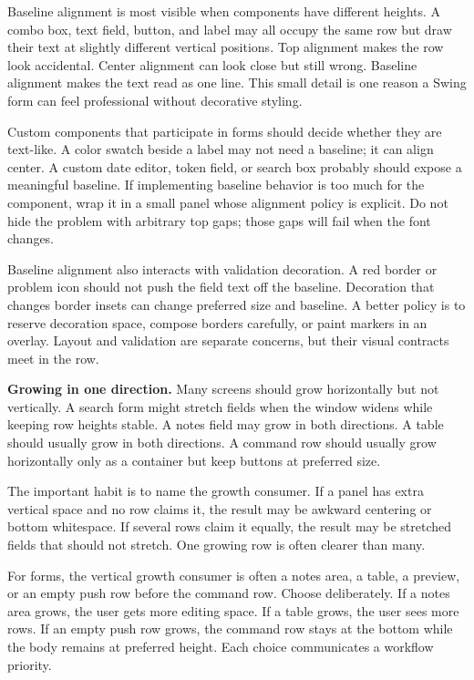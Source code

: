 Baseline alignment is most visible when components have different heights. A
combo box, text field, button, and label may all occupy the same row but draw
their text at slightly different vertical positions. Top alignment makes the row
look accidental. Center alignment can look close but still wrong. Baseline
alignment makes the text read as one line. This small detail is one reason a
Swing form can feel professional without decorative styling.

Custom components that participate in forms should decide whether they are
text-like. A color swatch beside a label may not need a baseline; it can align
center. A custom date editor, token field, or search box probably should expose
a meaningful baseline. If implementing baseline behavior is too much for the
component, wrap it in a small panel whose alignment policy is explicit. Do not
hide the problem with arbitrary top gaps; those gaps will fail when the font
changes.

Baseline alignment also interacts with validation decoration. A red border or
problem icon should not push the field text off the baseline. Decoration that
changes border insets can change preferred size and baseline. A better policy
is to reserve decoration space, compose borders carefully, or paint markers in
an overlay. Layout and validation are separate concerns, but their visual
contracts meet in the row.

\textbf{Growing in one direction.}
Many screens should grow horizontally but not vertically. A search form might stretch fields when the window widens while keeping row heights stable. A notes field may grow in both directions. A table should usually grow in both directions. A command row should usually grow horizontally only as a container but keep buttons at preferred size.

The important habit is to name the growth consumer. If a panel has extra vertical space and no row claims it, the result may be awkward centering or bottom whitespace. If several rows claim it equally, the result may be stretched fields that should not stretch. One growing row is often clearer than many.

For forms, the vertical growth consumer is often a notes area, a table, a
preview, or an empty push row before the command row. Choose deliberately. If a
notes area grows, the user gets more editing space. If a table grows, the user
sees more rows. If an empty push row grows, the command row stays at the bottom
while the body remains at preferred height. Each choice communicates a workflow
priority.

